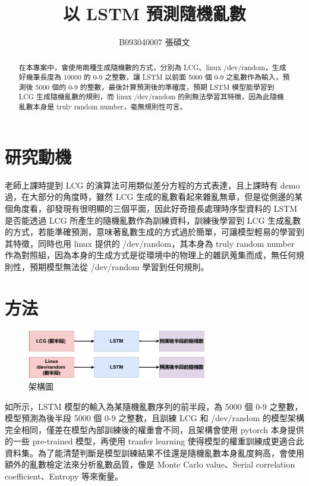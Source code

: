 \documentclass[a4paper, 12pt]{article}
\begin{document}
\begin{CJK}{UTF8}{bkai}
	\renewcommand{\abstractname}{\Large 摘要}
	\newcommand{\pluseq}{\mathrel{+}=}
	\title{以 LSTM 預測隨機亂數}
	\author{B093040007 張碩文}
	\date{}
	\maketitle
	\vspace{-4em}
	\begin{abstract}
		在本專案中，會使用兩種生成隨機數的方式，分別為 LCG、linux /dev/random，生成好幾筆長度為 10000 的 0-9 之整數，讓 LSTM 以前面 5000 個 0-9 之亂數作為輸入，預測後 5000 個的 0-9 的整數，最後計算預測後的準確度，預期 LSTM 模型能學習到 LCG 生成隨機亂數的規則，而 linux /dev/random 的則無法學習其特徵，因為此隨機亂數本身是 truly random number，毫無規則性可言。
	\end{abstract}
	
	\section{研究動機}
	老師上課時提到 LCG 的演算法可用類似差分方程的方式表達，且上課時有 demo 過，在大部分的角度時，雖然 LCG 生成的亂數看起來雜亂無章，但是從側邊的某個角度看，卻發現有很明顯的三個平面，因此好奇擅長處理時序型資料的 LSTM 是否能透過 LCG 所產生的隨機亂數作為訓練資料，訓練後學習到 LCG 生成亂數的方式，若能準確預測，意味著亂數生成的方式過於簡單，可讓模型輕易的學習到其特徵，同時也用 linux 提供的 /dev/random，其本身為 truly random number 作為對照組，因為本身的生成方式是從環境中的物理上的雜訊蒐集而成，無任何規則性，預期模型無法從 /dev/random 學習到任何規則。 	
	\section{方法}
	\begin{figure}[tbh]
		\centering
		\includegraphics[width=0.7\textwidth]{src/NM_Architecture.pdf}
		\caption{架構圖}
		\label{fig-NM_Architecture}
	\end{figure}
	如所示，LSTM 模型的輸入為某隨機亂數序列的前半段，為 5000 個 0-9 之整數，模型預測為後半段 5000 個 0-9 之整數，且訓練 LCG 和 /dev/random 的模型架構完全相同，僅差在模型內部訓練後的權重會不同，且架構會使用 pytorch 本身提供的一些 pre-trained 模型，再使用 tranfer learning 使得模型的權重訓練成更適合此資料集。為了能清楚判斷是模型訓練結果不佳還是隨機亂數本身亂度夠高，會使用額外的亂數檢定法來分析亂數品質，像是 Monte Carlo value、Serial correlation coefficient、Entropy 等來衡量。

\end{CJK}
\end{document}
